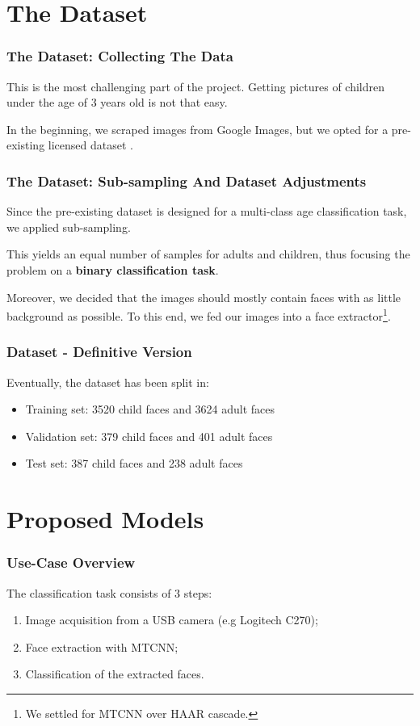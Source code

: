 \documentclass{beamer}
\begin{document}
	\section{The Dataset}
	
	\begin{frame}
		\frametitle{The Dataset: Collecting The Data}
		This is the most challenging part of the project. Getting pictures of children under the age of 3 years old is not that easy.
		
		\bigskip
	
		In the beginning, we scraped images from Google Images, but we opted for a pre-existing licensed dataset .
	\end{frame}

	\begin{frame}
		\frametitle{The Dataset: Sub-sampling And Dataset Adjustments}
		Since the pre-existing dataset is designed for a multi-class age classification task, we applied sub-sampling.
		
		\bigskip
		
		This yields an equal number of samples for adults and children, thus focusing the problem on a \textbf{binary classification task}.
		
		\bigskip
		
		Moreover, we decided that the images should mostly contain faces with as little background as possible. To this end, we fed our images into a face extractor\footnote{We settled for MTCNN over HAAR cascade.}.

	\end{frame}

	\begin{frame}
		\frametitle{Dataset - Definitive Version}
		Eventually, the dataset has been split in:		
		\begin{itemize}
			\item Training set: 3520 child faces and 3624 adult faces
			\item Validation set: 379 child faces and 401 adult faces
			\item Test set: 387 child faces and 238 adult faces
		\end{itemize}
	\end{frame}

	\section{Proposed Models}
	
	\begin{frame}
		\frametitle{Use-Case Overview}
		The classification task consists of 3 steps:
		\begin{enumerate}
			\item Image acquisition from a USB camera (e.g Logitech C270);
			\item Face extraction with MTCNN;
			\item Classification of the extracted faces.
		\end{enumerate}
	\end{frame}	
	
\end{document}
